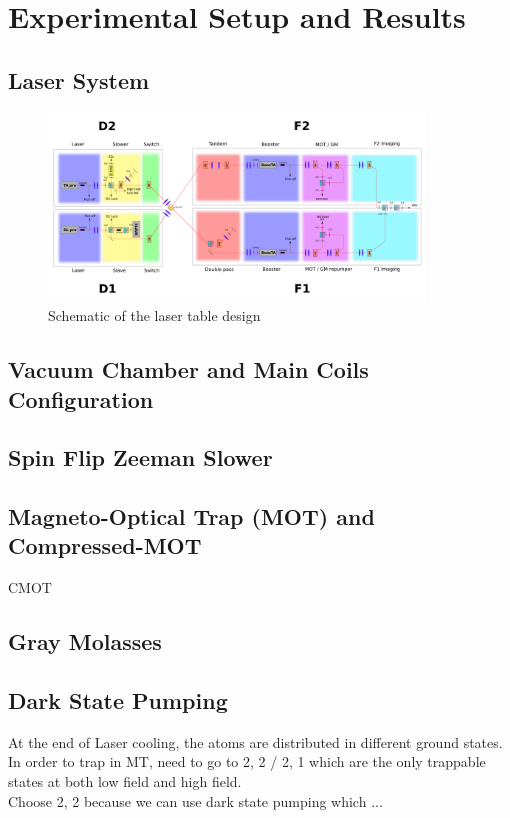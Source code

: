 \chapter{Experimental Setup and Results}

\section{Laser System}
\begin{figure}
  \begin{center}
    \includegraphics[width=10cm]{laser_table.png}
  \end{center}
  \caption{Schematic of the laser table design}
  \label{laser-table}
\end{figure}

\section{Vacuum Chamber and Main Coils Configuration}

\section{Spin Flip Zeeman Slower}

\section{Magneto-Optical Trap (MOT) and Compressed-MOT}

CMOT

\section{Gray Molasses}

\section{Dark State Pumping}

At the end of Laser cooling, the atoms are distributed in different ground states.\\
In order to trap in MT, need to go to 2, 2 / 2, 1 which are the only trappable states at both low field and high field.\\
Choose 2, 2 because we can use dark state pumping which ...

